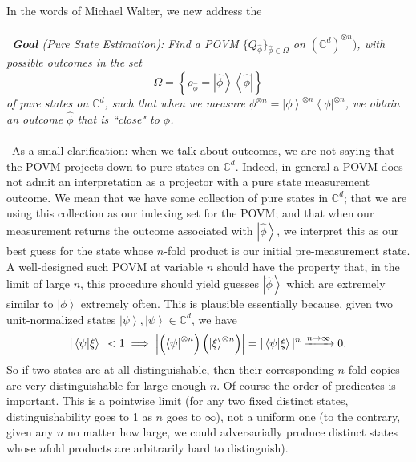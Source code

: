 \documentclass[11pt,letterpaper]{article}
\newcommand{\LP}{\left(}
\newcommand{\RP}{\right)}
\newcommand{\C}{\mathbb{C}}
\newcommand{\KET}[1]{\left| #1 \right\rangle }
\newcommand{\BRA}[1]{\left\langle #1 \right| }
\newcommand{\IP}[2]{\left\langle #1 \middle| #2 \right\rangle}
\begin{document}
In the words of Michael Walter, we new address the\\
\\
\
\textit{\textbf{Goal} (Pure State Estimation): Find a POVM $\{ Q_{\hat{\phi}} \}_{\hat{\phi} \in \Omega}$ on $(\C^d)^{\otimes n})$, with possible outcomes in the set \begin{equation}
\Omega = \left\{ \rho_{\hat{\phi}} = \KET{\hat{\phi}} \BRA{\hat{\phi}} \right\}
\end{equation} of pure states on $\C^d$, such that when we measure $\phi^{\otimes n} = \KET{\phi}^{\otimes n} \BRA{\phi}^{\otimes n}$, we obtain an outcome $\hat{\phi}$ that is ``close" to $\phi$. }\\
\\
\
As a small clarification: when we talk about outcomes, we are not saying that the POVM projects down to pure states on $\C^d$. Indeed, in general a POVM does not admit an interpretation as a projector with a pure state measurement outcome. We mean that we have some collection of pure states in $\C^d$; that we are using this collection as our indexing set for the POVM; and that when our measurement returns the outcome associated with $\KET{\hat{\phi}}$, we interpret this as our best guess for the state whose $n$-fold product is our initial pre-measurement state. A well-designed such POVM at variable $n$ should have the property that, in the limit of large $n$, this procedure should yield guesses $\KET{\hat{\phi}}$ which are extremely similar to $\KET{\phi}$ extremely often. This is plausible essentially because, given two unit-normalized states $\KET{\psi}, \KET{\psi} \in \C^d$, we have \begin{equation}
| \IP{\psi}{\xi}| < 1 \implies \left| \LP \BRA{\psi}^{\otimes n} \RP \LP \KET{\xi}^{\otimes n} \RP   \right| = | \IP{\psi}{\xi}|^n \xmapsto{n \to \infty} 0.
\end{equation}
So if two states are at all distinguishable, then their corresponding $n$-fold copies are very distinguishable for large enough $n$. Of course the order of predicates is important. This is a pointwise limit (for any two fixed distinct states, distinguishability goes to 1 as $n$ goes to $\infty$), not a uniform one (to the contrary, given any $n$ no matter how large, we could adversarially produce distinct states whose $n$fold products are arbitrarily hard to distinguish).
\end{document}
